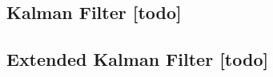 \begin{comment}
------------------------------------------------------------------------------------------
- \cite{kalman1960new}
- \cite{kurth2003experimental}
	- Originally introduced in 1960, the Kalman lter assumes a multivariate Gaussian distribution [6]. The Kalman lter has the advantage that the representation of the distribution is compact; a Gaussian distribution can be represented by a mean and a covariance matrix. The robot's pose estimation is maintained as a Gaussian distribution and sensor data from dead reckoning and landmark observations is fused to obtain a new position distribution.
	- Our results with Kalman ltering require an under-standing of the characteristics of the noise present in ranges reported by the radio tags. We gain this by look-ing at the probability distribution functions for each tag measurement.
	- We obtain the PDFs as follows: for every reported measurement, we nd the true range to the robot when that distance was reported. We do this by comparing the known location of the reporting tag to the times-tamped true location of the robot when the report was received.
	- the covariance matrix, which describes the uncertainty and correlation of the terms in the state estimate.
	- However, when the same initial noisy tag locations are used with Test 2, our SLAM technique fails to converge. Since the Kalman lter uses a linearization of the nonlinear range measurements, if the linearized estimate is too far away from the truth, the lter may be unable to recover and will diverge.
	-

\end{comment}
\subsection{Kalman Filter [todo]}


\begin{comment}
------------------------------------------------------------------------------------------
- \cite{kurth2003experimental}
	- Recent extensions of Kalman ltering allow for non-Gaussian, multimodal probability distributions through multiple hypothesis tracking. The result is a more versatile estimation technique that still preserves many of the computational advantages of the Kalman filter.
\end{comment}
\subsection{Extended Kalman Filter [todo]}

